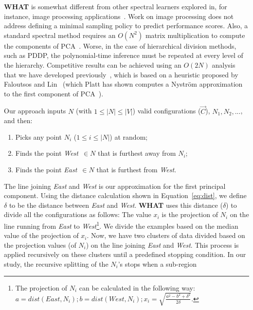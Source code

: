 \documentclass{newsig}
\newcommand{\what}{{\bf WHAT }}
\begin{document}
\what is somewhat different from other spectral
learners explored in, for instance, image processing applications~\cite{shi00}.
Work on image processing does not address
defining a minimal sampling policy to predict performance scores.
Also, a standard spectral method requires an $O(N^2)$ matrix multiplication to compute the components
of PCA~\cite{ilin10}. Worse, in the case of hierarchical division methods, such as PDDP,
the polynomial-time inference must be repeated at every level of the hierarchy.
Competitive results can be achieved
using an $O(2N)$ analysis that we have developed previously~\cite{me12d}, which is  based on  a heuristic proposed by Faloutsos and Lin~\cite{Faloutsos1995} (which Platt has shown computes a Nystr\"om approximation to the first component of PCA~\cite{platt05}).

Our approach inputs $N$ (with $1\leq \left\vert{N}\right\vert\leq \left\vert{V}\right\vert$)
valid configurations ($\vec{C}$), $N_1,N_2,...$, and then:
\begin{enumerate}
\item
Picks any
point $N_i$ ($1\leq i \leq\left\vert{N}\right\vert$) at random;
\item
Finds
 the point  {\em West}~$\in N$ that is
furthest away from $N_i$;
\item Finds the point {\em East}~$\in N$
that is furthest from {\em West}.
\end{enumerate}
The line joining {\em East}
and {\em West} is our approximation for the first principal component.
Using the distance calculation shown in Equation~\ref{eq:dist}, 
we define $\delta$ to be the distance between {\em East}
and {\em West}. 
\what uses this distance ($\delta$) to divide all the configurations as follows:
The value $x_i$ is the projection of $N_i$
on the line  running  from {\em East} to {\em West}\footnote{The projection of $N_i$ can be calculated in the following way:\newline $a = \mathit{dist}(\mathit{East}, N_i); b = \mathit{dist}(\mathit{West}, N_i);  x_i = \sqrt{\frac{a^2 - b^2 + \delta^2}{2\delta}}$.
}.  We divide
the examples based on the median value of the projection of $x_i$. Now, we have two clusters of data divided based on the projection values (of $N_i$) on the line joining {\em East} and {\em West}. This process is applied recursively on these clusters until a predefined stopping condition. In our study, the  recursive splitting of the $N_i$'s stops when a sub-region
\end{document}
